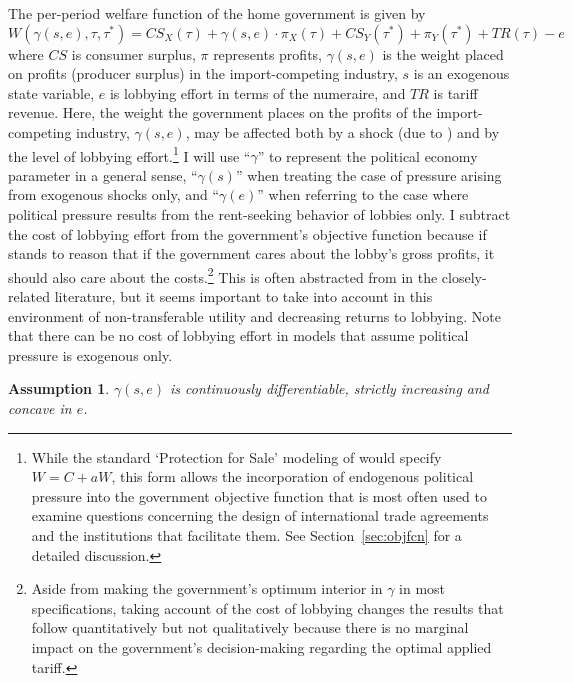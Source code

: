 \documentclass[12pt,titlepage]{article}
\newtheorem{assumption}{Assumption}
\newcommand{\ga}{\gamma}
\begin{document}
The per-period welfare function of the home government is given by
\begin{equation}
  W(\ga(s,e),\tau,\tau^*) = \mathit{CS}_X(\tau) + \ga(s,e) \cdot \pi_X(\tau) + \mathit{CS}_Y(\tau^*) + \pi_Y(\tau^*) + \mathit{TR}(\tau) - e
  \label{eq:wel}
\end{equation}
where $\mathit{CS}$ is consumer surplus, $\pi$ represents profits, $\ga(s,e)$ is the weight placed on profits (producer surplus) in the import-competing industry, $s$ is an exogenous state variable, $e$ is lobbying effort in terms of the numeraire, and $\mathit{TR}$ is tariff revenue. Here, the weight the government places on the profits of the import-competing industry, $\ga(s,e)$, may be affected both by a shock (due to \Textcite{ms2011}) and by the level of lobbying effort.\footnote{While the standard `Protection for Sale' modeling of \Textcite{gh94} would specify $W = C + aW$, this form allows the incorporation of endogenous political pressure into the government objective function that is most often used to examine questions concerning the design of international trade agreements and the institutions that facilitate them. See Section~\ref{sec:objfcn} for a detailed discussion.} I will use ``$\ga$'' to represent the political economy parameter in a general sense, ``$\ga(s)$'' when treating the case of pressure arising from exogenous shocks only, and ``$\ga(e)$'' when referring to the case where political pressure  results from the rent-seeking behavior of lobbies only. I subtract the cost of lobbying effort from the government's objective function because if stands to reason that if the government cares about the lobby's gross profits, it should also care about the costs.\footnote{Aside from making the government's optimum interior in $\ga$ in most specifications, taking account of the cost of lobbying changes the results that follow quantitatively but not qualitatively because there is no marginal impact on the government's decision-making regarding the optimal applied tariff.} This is often abstracted from in the closely-related literature, but it seems important to take into account in this environment of non-transferable utility and decreasing returns to lobbying. Note that there can be no cost of lobbying effort in models that assume political pressure is exogenous only.

\begin{assumption}
  $\ga(s,e)$ is continuously differentiable, strictly increasing and concave in $e$.
  \label{as:ga_c3}
\end{assumption}
\end{document}
